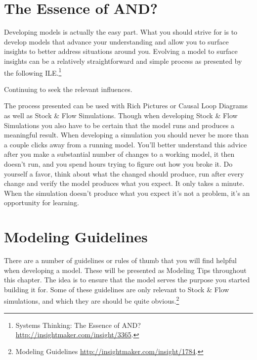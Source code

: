 \documentclass[]{memoir}
\begin{document}
\section{The Essence of AND?}

Developing models is actually the easy part. What you should strive for
is to develop models that advance your understanding and allow you to
surface insights to better address situations around you. Evolving a
model to surface insights can be a relatively straightforward and simple
process as presented by the following ILE.\footnote{Systems Thinking:
  The Essence of AND? \url{http://insightmaker.com/insight/3365}.}

\FloatBarrier 

\begin{model}[frametitle={Model: Systems Thinking: The Essence of AND?}] 

 Continuing to seek the relevant influences.




 \end{model}

The process presented can be used with Rich Pictures or Causal Loop
Diagrams as well as Stock \& Flow Simulations. Though when developing
Stock \& Flow Simulations you also have to be certain that the model
runs and produces a meaningful result. When developing a simulation you
should never be more than a couple clicks away from a running model.
You'll better understand this advice after you make a substantial number
of changes to a working model, it then doesn't run, and you spend hours
trying to figure out how you broke it. Do yourself a favor, think about
what the changed should produce, run after every change and verify the
model produces what you expect. It only takes a minute. When the
simulation doesn't produce what you expect it's not a problem, it's an
opportunity for learning.

\section{Modeling Guidelines}

There are a number of guidelines or rules of thumb that you will find
helpful when developing a model. These will be presented as Modeling
Tips throughout this chapter. The idea is to ensure that the model
serves the purpose you started building it for. Some of these guidelines
are only relevant to Stock \& Flow simulations, and which they are
should be quite obvious.\footnote{Modeling Guidelines
  \url{http://insightmaker.com/insight/1784}.}
\end{document}
